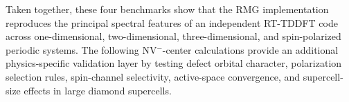 Taken together, these four benchmarks show that the RMG implementation
reproduces the principal spectral features of an independent RT-TDDFT
code across one-dimensional, two-dimensional, three-dimensional, and
spin-polarized periodic systems.  The following NV$^{-}$-center
calculations provide an additional physics-specific validation layer by
testing defect orbital character, polarization selection rules,
spin-channel selectivity, active-space convergence, and supercell-size
effects in large diamond supercells.
